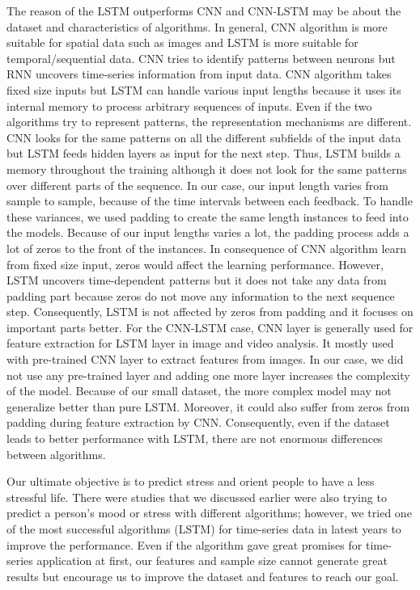 \documentclass[3p,times,procedia]{elsarticle}
\begin{document}
The reason of the LSTM outperforms CNN and CNN-LSTM may be about the dataset and characteristics of algorithms. In general, CNN algorithm is more suitable for spatial data such as images and LSTM is more suitable for temporal/sequential data. CNN tries to identify patterns between neurons but RNN uncovers time-series information from input data. CNN algorithm takes fixed size inputs but LSTM can handle various input lengths because it uses its internal memory to process arbitrary sequences of inputs. Even if the two algorithms try to represent patterns, the representation mechanisms are different. CNN looks for the same patterns on all the different subfields of the input data but LSTM feeds hidden layers as input for the next step. Thus, LSTM builds a memory throughout the training although it does not look for the same patterns over different parts of the sequence. In our case, our input length varies from sample to sample, because of the time intervals between each feedback. To handle these variances, we used padding to create the same length instances to feed into the models. Because of our input lengths varies a lot, the padding process adds a lot of zeros to the front of the instances. In consequence of CNN algorithm learn from fixed size input, zeros would affect the learning performance. However, LSTM uncovers time-dependent patterns but it does not take any data from padding part because zeros do not move any information to the next sequence step. Consequently, LSTM is not affected by zeros from padding and it focuses on important parts better. For the CNN-LSTM case, CNN layer is generally used for feature extraction for LSTM layer in image and video analysis. It mostly used with pre-trained CNN layer to extract features from images. In our case, we did not use any pre-trained layer and adding one more layer increases the complexity of the model. Because of our small dataset, the more complex model may not generalize better than pure LSTM. Moreover, it could also suffer from zeros from padding during feature extraction by CNN. Consequently, even if the dataset leads to better performance with LSTM, there are not enormous differences between algorithms.

Our ultimate objective is to predict stress and orient people to have a less stressful life. There were studies that we discussed earlier were also trying to predict a person's mood or stress with different algorithms; however, we tried one of the most successful algorithms (LSTM) for time-series data in latest years to improve the performance. Even if the algorithm gave great promises for time-series application at first, our features and sample size cannot generate great results but encourage us to improve the dataset and features to reach our goal.
\end{document}
